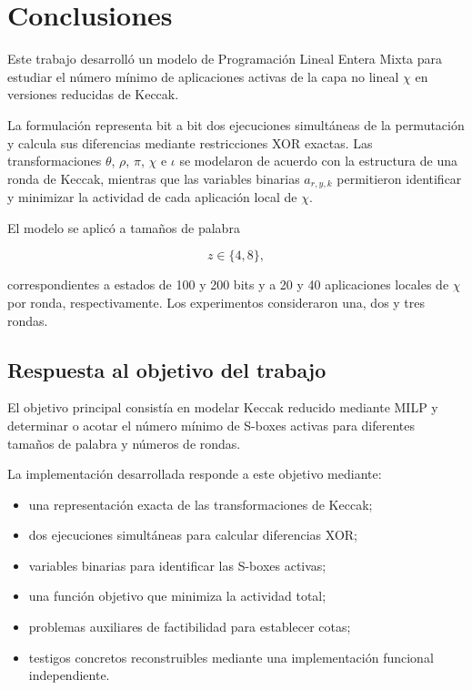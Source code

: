 ﻿\section{Conclusiones}
\label{sec:conclusiones}

Este trabajo desarrolló un modelo de Programación Lineal Entera Mixta para
estudiar el número mínimo de aplicaciones activas de la capa no lineal
$\chi$ en versiones reducidas de Keccak.

La formulación representa bit a bit dos ejecuciones simultáneas de la
permutación y calcula sus diferencias mediante restricciones XOR exactas.
Las transformaciones $\theta$, $\rho$, $\pi$, $\chi$ e $\iota$ se modelaron
de acuerdo con la estructura de una ronda de Keccak, mientras que las
variables binarias $a_{r,y,k}$ permitieron identificar y minimizar la
actividad de cada aplicación local de $\chi$.

El modelo se aplicó a tamaños de palabra

\[
z\in\{4,8\},
\]

correspondientes a estados de 100 y 200 bits y a 20 y 40 aplicaciones
locales de $\chi$ por ronda, respectivamente. Los experimentos consideraron
una, dos y tres rondas.


\subsection{Respuesta al objetivo del trabajo}
\label{subsec:respuesta_objetivo}

El objetivo principal consistía en modelar Keccak reducido mediante MILP
y determinar o acotar el número mínimo de S-boxes activas para diferentes
tamaños de palabra y números de rondas.

La implementación desarrollada responde a este objetivo mediante:

\begin{itemize}
    \item una representación exacta de las transformaciones de Keccak;
    \item dos ejecuciones simultáneas para calcular diferencias XOR;
    \item variables binarias para identificar las S-boxes activas;
    \item una función objetivo que minimiza la actividad total;
    \item problemas auxiliares de factibilidad para establecer cotas;
    \item testigos concretos reconstruibles mediante una implementación
    funcional independiente.
\end{itemize}

